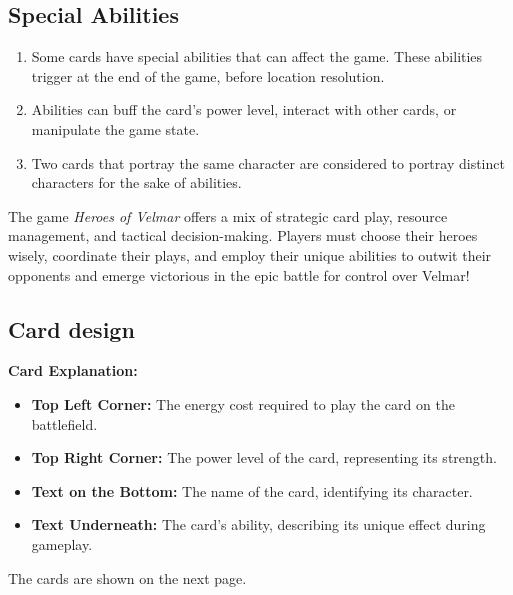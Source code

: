 \subsection*{Special Abilities}
\begin{enumerate}
  \item Some cards have special abilities that can affect the game. These abilities trigger at the end of the game, before location resolution.
  \item Abilities can buff the card's power level, interact with other cards, or manipulate the game state.
  \item Two cards that portray the same character are considered to portray distinct characters for the sake of abilities.
\end{enumerate}

The game \emph{Heroes of Velmar} offers a mix of strategic card play, resource management, and tactical decision-making.
Players must choose their heroes wisely, coordinate their plays, and employ their unique abilities to outwit their opponents and emerge victorious in the epic battle for control over Velmar!

\subsection*{Card design}


\textbf{Card Explanation:}

\begin{itemize}
    \item \textbf{Top Left Corner:} The energy cost required to play the card on the battlefield.
    \item \textbf{Top Right Corner:} The power level of the card, representing its strength.
    \item \textbf{Text on the Bottom:} The name of the card, identifying its character.
    \item \textbf{Text Underneath:} The card's ability, describing its unique effect during gameplay.
\end{itemize}

\ifplastex
\else
The cards are shown on the next page.
\fi

